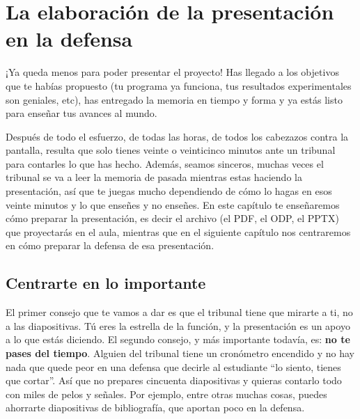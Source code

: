 \chapter{La elaboración de la presentación en la defensa} \label{cap:elaboraciónPresentación}


¡Ya queda menos para poder presentar el proyecto! Has llegado a los objetivos que te habías propuesto (tu programa ya funciona, tus resultados experimentales son geniales, etc), has entregado la memoria en tiempo y forma y ya estás listo para enseñar tus avances al mundo.

Después de todo el esfuerzo, de todas las horas, de todos los cabezazos contra la pantalla, resulta que solo tienes veinte o veinticinco minutos ante un tribunal para contarles lo que has hecho. Además, seamos sinceros, muchas veces el tribunal se va a leer la memoria de pasada mientras estas haciendo la presentación, así que te juegas mucho dependiendo de cómo lo hagas en esos veinte minutos y lo que enseñes y no enseñes. En este capítulo te enseñaremos cómo preparar la presentación, es decir el archivo (el PDF, el ODP, el PPTX) que proyectarás en el aula, mientras que en el siguiente capítulo nos centraremos en cómo preparar la defensa de esa presentación.

\section{Centrarte en lo importante}

El primer consejo que te vamos a dar es que el tribunal tiene que mirarte a ti, no a las diapositivas. Tú eres la estrella de la función, y la presentación es un apoyo a lo que estás diciendo. El segundo consejo, y más importante todavía, es: \textbf{no te pases del tiempo}. Alguien del tribunal tiene un cronómetro encendido y no hay nada que quede peor en una defensa que decirle al estudiante ``lo siento, tienes que cortar''. Así que no prepares cincuenta diapositivas y quieras contarlo todo con miles de pelos y señales. Por ejemplo, entre otras muchas cosas, puedes ahorrarte diapositivas de bibliografía, que aportan poco en la defensa.

